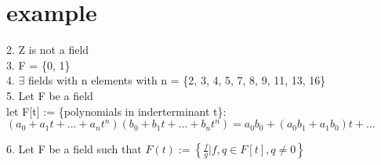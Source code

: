 \documentclass[11pt]{article}
\begin{document}
\section{example}
2. Z is not a field\\

3. F = \{0, 1\}\\

4. $\exists$ fields with n elements with n = \{2, 3, 4, 5, 7, 8, 9, 11, 13, 16\}\\

5. Let F be a field \\
let F[t] := \{polynomials in inderterminant t\}:\\
$(a_0+a_1t+...+a_nt^n)(b_0+b_1t+...+b_nt^n) = a_0b_0+(a_0b_1+a_1b_0)t+...$

6. Let F be a field such that $F(t) := \left\{\frac{f}{g}| f,q\in F[t], q\neq 0\right\}$
\end{document}
